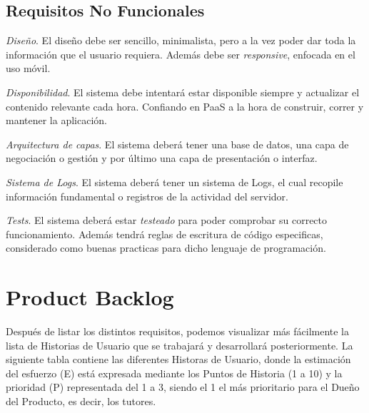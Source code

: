\subsection{Requisitos No Funcionales}

\begin{enumerate}
    { \renewcommand\labelenumi{R.N. \theenumi}
    \item
    \textit{Diseño}. El diseño debe ser sencillo, minimalista, pero a la vez poder dar toda la información que el usuario requiera. Además debe ser \textit{responsive}, enfocada en el uso móvil.
    \item
    \textit{Disponibilidad}. El sistema debe intentará estar disponible siempre y actualizar el contenido relevante cada hora. Confiando en \ac{PaaS} a la hora de construir, correr y mantener la aplicación.
    \item
    \textit{Arquitectura de capas}. El sistema deberá tener una base de datos, una capa de negociación o gestión y por último una capa de presentación o interfaz.
    \item
    \textit{Sistema de Logs}. El sistema deberá tener un sistema de Logs, el cual recopile información fundamental o registros de la actividad del servidor.
    \item
    \textit{Tests}. El sistema deberá estar \textit{testeado} para poder comprobar su correcto funcionamiento. Además tendrá reglas de escritura de código especificas, considerado como buenas practicas para dicho lenguaje de programación.
}\end{enumerate}

\newpage

\section{Product Backlog}
Después de listar los distintos requisitos, podemos visualizar más fácilmente la lista de Historias de Usuario que se trabajará y desarrollará posteriormente. La siguiente tabla contiene las diferentes Historas de Usuario, donde la estimación del esfuerzo (E) está expresada mediante los Puntos de Historia (1 a 10) y la prioridad (P) representada del 1 a 3, siendo el 1 el más prioritario para el Dueño del Producto, es decir, los tutores.

